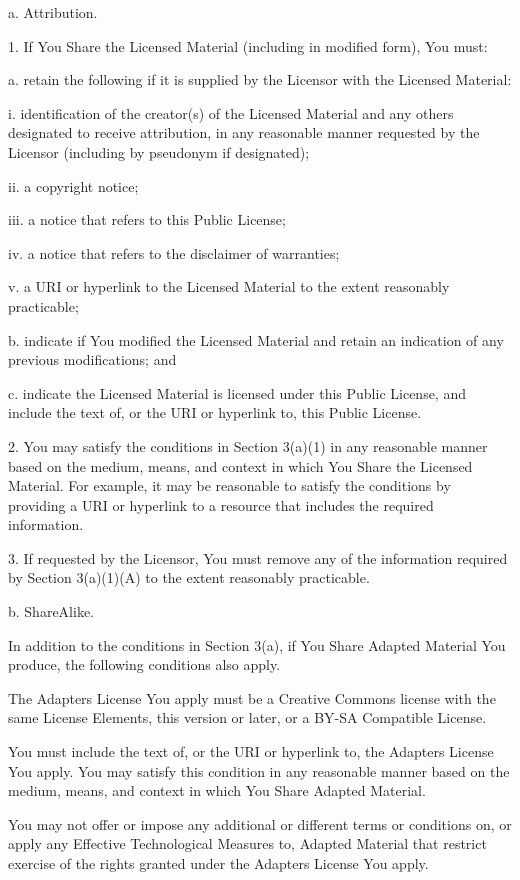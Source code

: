 a. Attribution. \begin{DoxyVerb} 1. If You Share the Licensed Material (including in modified
    form), You must:

      a. retain the following if it is supplied by the Licensor
         with the Licensed Material:

           i. identification of the creator(s) of the Licensed
              Material and any others designated to receive
              attribution, in any reasonable manner requested by
              the Licensor (including by pseudonym if
              designated);

          ii. a copyright notice;

         iii. a notice that refers to this Public License;

          iv. a notice that refers to the disclaimer of
              warranties;

           v. a URI or hyperlink to the Licensed Material to the
              extent reasonably practicable;

      b. indicate if You modified the Licensed Material and
         retain an indication of any previous modifications; and

      c. indicate the Licensed Material is licensed under this
         Public License, and include the text of, or the URI or
         hyperlink to, this Public License.

 2. You may satisfy the conditions in Section 3(a)(1) in any
    reasonable manner based on the medium, means, and context in
    which You Share the Licensed Material. For example, it may be
    reasonable to satisfy the conditions by providing a URI or
    hyperlink to a resource that includes the required
    information.

 3. If requested by the Licensor, You must remove any of the
    information required by Section 3(a)(1)(A) to the extent
    reasonably practicable.
\end{DoxyVerb}
 b. Share\+Alike.

In addition to the conditions in Section 3(a), if You Share Adapted Material You produce, the following conditions also apply.


\begin{DoxyEnumerate}
\item The Adapter\textquotesingle{}s License You apply must be a Creative Commons license with the same License Elements, this version or later, or a BY-\/\+SA Compatible License.
\item You must include the text of, or the URI or hyperlink to, the Adapter\textquotesingle{}s License You apply. You may satisfy this condition in any reasonable manner based on the medium, means, and context in which You Share Adapted Material.
\item You may not offer or impose any additional or different terms or conditions on, or apply any Effective Technological Measures to, Adapted Material that restrict exercise of the rights granted under the Adapter\textquotesingle{}s License You apply.
\end{DoxyEnumerate}

